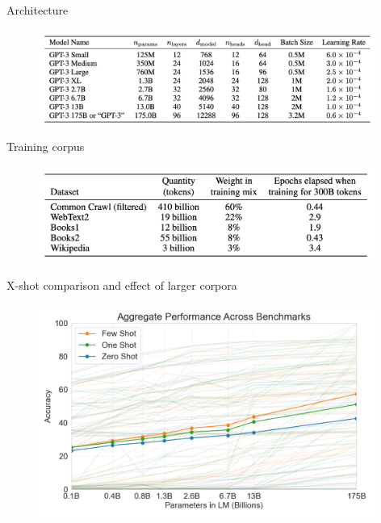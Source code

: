 \begin{vbframe}{Architecture}

\vfill

	\begin{figure}
		\centering
		\includegraphics[width=11cm]{figure/gptarch.png}
	\end{figure}

\vfill

\end{vbframe}



\begin{vbframe}{Training corpus}

\vfill

	\begin{figure}
		\centering
		\includegraphics[width=11cm]{figure/traincorp.png}
	\end{figure}
\vfill

\end{vbframe}



\begin{vbframe}{X-shot comparison and effect of larger corpora}
	
	\vfill
	
	\begin{figure}
		\centering
		\includegraphics[width=11cm]{figure/xshotlargecorpora.png}
	\end{figure}
	
	\vfill
	
\end{vbframe}


